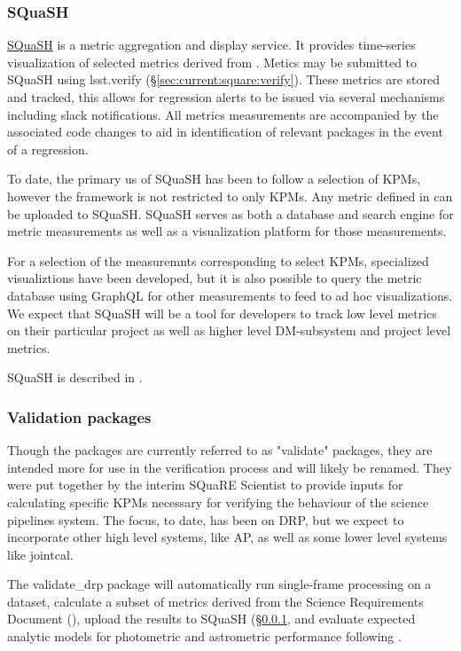 \documentclass[DM,authoryear,toc,lsstdraft]{lsstdoc}
\begin{document}
\subsubsection{SQuaSH}
\label{sec:current:square:squash}

\href{https://squash.lsst.codes}{SQuaSH} is a metric aggregation and display
service. It provides time-series visualization of selected metrics derived
from . Metics may be submitted to SQuaSH using lsst.verify
(\S\ref{sec:current:square:verify}). These metrics are stored and tracked,
this allows for regression alerts to be issued via several mechanisms including
slack notifications.  All metrics measurements are accompanied by the
associated code changes to aid in identification of relevant packages in the
event of a regression.

To date, the primary us
of SQuaSH has been to follow a selection of KPMs, however the framework is not
restricted to only KPMs. Any metric defined in  can
be uploaded to SQuaSH. SQuaSH serves as both a database and search engine for
metric measurements as well as a visualization platform for those measurements.

For a selection of the measuremnts corresponding to select KPMs, specialized
visualiztions have been developed, but it is also possible to query the metric
database using GraphQL for other measurements to feed to ad hoc visualizations.
We expect that SQuaSH will be a tool for developers to track low level metrics
on their particular project as well as higher level DM-subsystem and project level
metrics.

SQuaSH is described in .

\subsubsection{Validation packages}
\label{sec:current:square:validate}

Though the packages are currently referred to as "validate" packages, they
are intended more for use in the verification process and will likely be renamed.
They were put together by the interim SQuaRE Scientist to provide inputs for
calculating specific KPMs necessary for verifying the behaviour of the
science pipelines system.  The focus, to date, has been on DRP, but we expect
to incorporate other high level systems, like AP, as well as some lower level
systems like jointcal.

The validate\_drp package will automatically run single-frame processing on a
dataset, calculate a subset of metrics derived from the Science Requirements
Document (), upload the results to SQuaSH
(\S\ref{sec:current:square:squash}, and evaluate expected analytic models for
photometric and astrometric performance following \cite{2008arXiv0805.2366I}.
\end{document}
